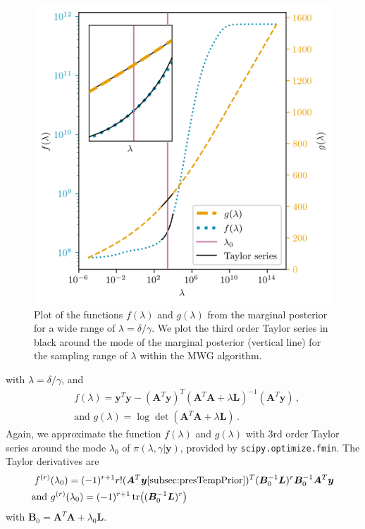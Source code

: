 \begin{figure}[ht!]
	\centering
	\includegraphics{f_and_g_phd.png}
	\caption[Plot of the functions $f(\lambda)$ and $g(\lambda)$ for marginal posterior.]{Plot of the functions $f(\lambda)$ and $g(\lambda)$ from the marginal posterior for a wide range of $\lambda = \delta / \gamma$. We plot the third order Taylor series in black around the mode of the marginal posterior (vertical line) for the sampling range of $\lambda$ within the MWG algorithm.}
	\label{fig:fandg}
\end{figure}
with $\lambda = \delta / \gamma$, and
\begin{subequations}
	\label{eq:Updfandg}
	\begin{align}
		&f ( \lambda) = \bm{y}^T \bm{y} - (\bm{A}^T \bm{y})^T (\bm{A}^T  \bm{A} + \lambda \bm{L})^{-1} (\bm{A}^T \bm{y})  \, ,  \\
		&\text{and } g(\lambda) = \log \det (\bm{A}^T  \bm{A} + \lambda \bm{L}) \, .
	\end{align}
\end{subequations}
Again, we approximate the function $f(\lambda)$ and $g(\lambda)$ with 3rd order Taylor series around the mode $\lambda_0$ of $\pi(\lambda, \gamma | \bm{y})$, provided by \texttt{scipy.optimize.fmin}.
The Taylor derivatives are
\begin{align}
	f^{(r)}& (\lambda_0)= (-1)^{r+1} r! (\bm{A}^T \bm{y}\ref{subsec:presTempPrior})^T (\bm{B}_0^{-1} \bm{L})^r \bm{B}_0^{-1} \bm{A}^T \bm{y} \label{eq:Updftay}  \\
	\text{and } &g^{(r)} ( \lambda_0) = (-1)^{r+1} \, \text{tr} \big( (\bm{B}_0^{-1}\bm{L})^r \big)
	\label{eq:Updgtay}
\end{align} 
with $\bm{B}_0 = \bm{A}^T  \bm{A} + \lambda_0 \bm{L}$.

